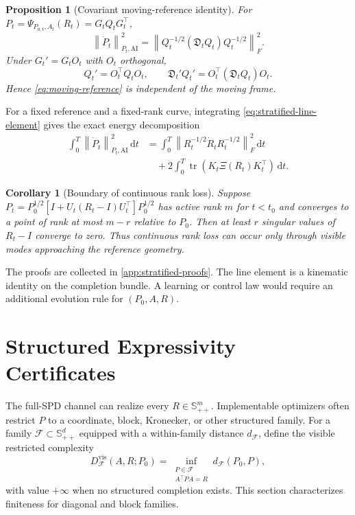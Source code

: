 \documentclass[10pt]{article}
\theoremstyle{plain}
\newtheorem{proposition}[theorem]{Proposition}
\newtheorem{corollary}[theorem]{Corollary}
\theoremstyle{definition}
\theoremstyle{remark}
\newcommand{\SPD}{\mathbb S_{++}}
\newcommand{\AI}{\mathrm{AI}}
\newcommand{\tr}{\operatorname{tr}}
\newcommand{\fro}[1]{\left\lVert #1\right\rVert_F}
\newcommand{\norm}[1]{\left\lVert #1\right\rVert}
\newcommand{\dd}{\mathrm d}
\newcommand{\Xiop}{\Xi}
\newcommand{\Fcal}{\mathcal F}
\begin{document}
\begin{proposition}[Covariant moving-reference identity]
\label{prop:moving-reference}
For \(P_t=\Psi_{P_{0,t},A_t}(R_t)=G_tQ_tG_t^\top\),
\begin{equation}
  \boxed{
  \norm{\dot P_t}_{P_t,\AI}^2
  =\fro{Q_t^{-1/2}(\mathfrak D_tQ_t)Q_t^{-1/2}}^2.}
  \label{eq:moving-reference}
\end{equation}
Under \(G_t'=G_tO_t\) with \(O_t\) orthogonal,
\[
  Q_t'=O_t^\top Q_tO_t,
  \qquad
  \mathfrak D_t'Q_t'=O_t^\top(\mathfrak D_tQ_t)O_t.
\]
Hence \eqref{eq:moving-reference} is independent of the moving frame.
\end{proposition}

For a fixed reference and a fixed-rank curve, integrating
\eqref{eq:stratified-line-element} gives the exact energy decomposition
\begin{align}
  \int_0^T\norm{\dot P_t}_{P_t,\AI}^2\,\dd t
  &=\int_0^T\fro{R_t^{-1/2}\dot R_tR_t^{-1/2}}^2\,\dd t
  \nonumber\\
  &\quad+2\int_0^T\tr(K_t\Xiop(R_t)K_t^\top)\,\dd t.
  \label{eq:integrated-energy}
\end{align}

\begin{corollary}[Boundary of continuous rank loss]
\label{cor:rank-loss}
Suppose
\(P_t=P_0^{1/2}[I+U_t(R_t-I)U_t^\top]P_0^{1/2}\) has active rank \(m\)
for \(t<t_0\) and converges to a point of rank at most \(m-r\) relative to
\(P_0\).  Then at least \(r\) singular values of \(R_t-I\) converge to zero.
Thus continuous rank loss can occur only through visible modes approaching the
reference geometry.
\end{corollary}

The proofs are collected in \cref{app:stratified-proofs}.  The line element is
a kinematic identity on the completion bundle.  A learning or control law
would require an additional evolution rule for \((P_0,A,R)\).

\section{Structured Expressivity Certificates}
\label{sec:structured-expressivity}

The full-SPD channel can realize every \(R\in\SPD^m\).  Implementable
optimizers often restrict \(P\) to a coordinate, block, Kronecker, or other
structured family.  For a family \(\Fcal\subset\SPD^d\) equipped with a
within-family distance \(d_\Fcal\), define the visible restricted complexity
\begin{equation}
  D_{\Fcal}^{\mathrm{vis}}(A,R;P_0)
  =
  \inf_{\substack{P\in\Fcal\\A^\top PA=R}}d_\Fcal(P_0,P),
  \label{eq:visible-restricted-complexity}
\end{equation}
with value \(+\infty\) when no structured completion exists.  This section
characterizes finiteness for diagonal and block families.
\end{document}
